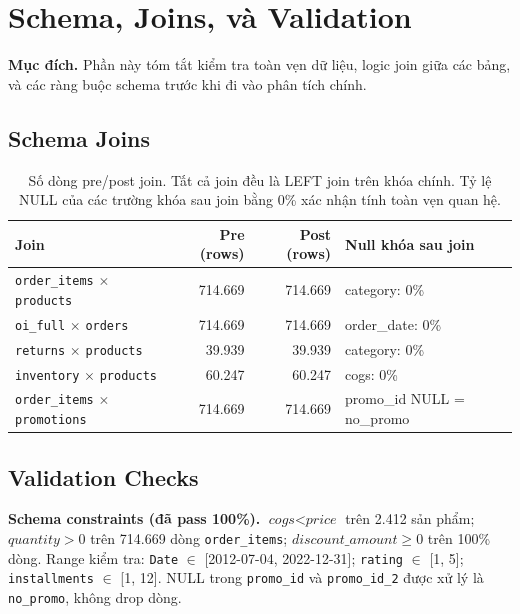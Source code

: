 \documentclass{article}
\begin{document}
\section{Schema, Joins, và Validation}
\label{app:schema}

\noindent\textbf{Mục đích.} Phần này tóm tắt kiểm tra toàn vẹn dữ liệu,
logic join giữa các bảng, và các ràng buộc schema trước khi đi vào phân
tích chính.

\subsection{Schema Joins}

\begin{table}[ht]
\centering
\caption{Số dòng pre/post join. Tất cả join đều là LEFT join trên khóa
chính. Tỷ lệ NULL của các trường khóa sau join bằng 0\% xác nhận tính toàn
vẹn quan hệ.}
\label{tab:joins}
\footnotesize
\begin{tabular}{L{3.6cm}rrL{3.0cm}}
\toprule
Join & Pre (rows) & Post (rows) & Null khóa sau join \\
\midrule
\texttt{order\_items} $\times$ \texttt{products} & 714.669 & 714.669 & category: 0\% \\
\texttt{oi\_full} $\times$ \texttt{orders} & 714.669 & 714.669 & order\_date: 0\% \\
\texttt{returns} $\times$ \texttt{products} & 39.939 & 39.939 & category: 0\% \\
\texttt{inventory} $\times$ \texttt{products} & 60.247 & 60.247 & cogs: 0\% \\
\texttt{order\_items} $\times$ \texttt{promotions} & 714.669 & 714.669 & promo\_id NULL = no\_promo \\
\bottomrule
\end{tabular}
\end{table}

\subsection{Validation Checks}

\noindent\textbf{Schema constraints (đã pass 100\%).}
$\textit{cogs} < \textit{price}$ trên 2.412 sản phẩm; $\textit{quantity} > 0$
trên 714.669 dòng \texttt{order\_items}; $\textit{discount\_amount} \geq 0$
trên 100\% dòng. Range kiểm tra: \texttt{Date} $\in$ [2012-07-04,
2022-12-31]; \texttt{rating} $\in$ [1, 5]; \texttt{installments} $\in$
[1, 12]. NULL trong \texttt{promo\_id} và \texttt{promo\_id\_2} được xử lý
là \texttt{no\_promo}, không drop dòng.
\end{document}
